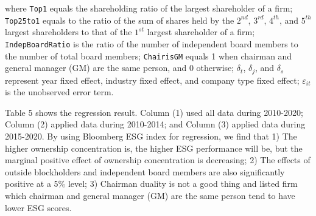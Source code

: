\documentclass[
  12pt,
]{article}
\begin{document}
where \texttt{Top1} equals the shareholding ratio of the largest
shareholder of a firm; \texttt{Top25to1} equals to the ratio of the sum
of shares held by the \(2^{nd}\), \(3^{rd}\), \(4^{th}\), and \(5^{th}\)
largest shareholders to that of the \(1^{st}\) largest shareholder of a
firm; \texttt{IndepBoardRatio} is the ratio of the number of independent
board members to the number of total board members; \texttt{ChairisGM}
equals 1 when chairman and general manager (GM) are the same person, and
0 otherwise; \(\delta_t\), \(\delta_j\), and \(\delta_{s}\) represent
year fixed effect, industry fixed effect, and company type fixed effect;
\(\varepsilon_{it}\) is the unobserved error term.

Table 5 shows the regression result. Column (1) used all data during
2010-2020; Column (2) applied data during 2010-2014; and Column (3)
applied data during 2015-2020. By using Bloomberg ESG index for
regression, we find that 1) The higher ownership concentration is, the
higher ESG performance will be, but the marginal positive effect of
ownership concentration is decreasing; 2) The effects of outside
blockholders and independent board members are also significantly
positive at a 5\% level; 3) Chairman duality is not a good thing and
listed firm which chairman and general manager (GM) are the same person
tend to have lower ESG scores.
\end{document}
